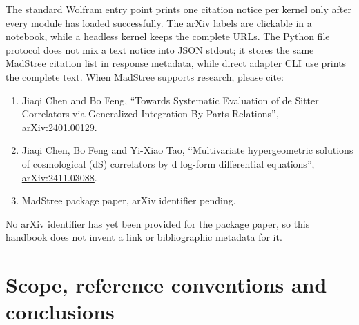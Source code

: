 \documentclass[11pt,a4paper]{article}
\begin{document}
The standard Wolfram entry point prints one citation notice per kernel only after every module
has loaded successfully. The arXiv labels are clickable in a notebook, while a headless kernel
keeps the complete URLs. The Python file protocol does not mix a text notice into JSON stdout;
it stores the same MadStree citation list in response metadata, while direct adapter CLI use
prints the complete text. When MadStree supports research, please cite:
\begin{enumerate}
  \item Jiaqi Chen and Bo Feng, ``Towards Systematic Evaluation of de Sitter Correlators via Generalized Integration-By-Parts Relations'', \href{https://arxiv.org/abs/2401.00129}{arXiv:2401.00129}.
  \item Jiaqi Chen, Bo Feng and Yi-Xiao Tao, ``Multivariate hypergeometric solutions of cosmological (dS) correlators by d log-form differential equations'', \href{https://arxiv.org/abs/2411.03088}{arXiv:2411.03088}.
  \item MadStree package paper, arXiv identifier pending.
\end{enumerate}
No arXiv identifier has yet been provided for the package paper, so this handbook does not
invent a link or bibliographic metadata for it.

\section{Scope, reference conventions and conclusions}
\end{document}
